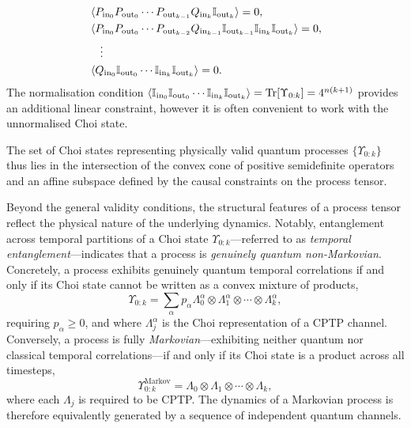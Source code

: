 \begin{enumerate}
    \begin{equation}
        \begin{split}
            &\braket{P_{\mathrm{in}_0}P_{\mathrm{out}_0}\cdots P_{\mathrm{out}_{k-1}}Q_{\mathrm{in}_k}\mathbb{I}_{\mathrm{out}_k}} = 0, \\
            &\braket{P_{\mathrm{in}_0}P_{\mathrm{out}_0}\cdots P_{\mathrm{out}_{k-2}}Q_{\mathrm{in}_{k-1}}\mathbb{I}_{\mathrm{out}_{k-1}}\mathbb{I}_{\mathrm{in}_k}\mathbb{I}_{\mathrm{out}_k}} = 0, \\
            &\quad\vdots \\
            &\braket{Q_{\mathrm{in}_0}\mathbb{I}_{\mathrm{out}_0}\cdots \mathbb{I}_{\mathrm{in}_k}\mathbb{I}_{\mathrm{out}_k}} = 0.
        \end{split}
    \end{equation}
    The normalisation condition \(\braket{\mathbb{I}_{\mathrm{in}_0}\mathbb{I}_{\mathrm{out}_0}\cdots \mathbb{I}_{\mathrm{in}_k}\mathbb{I}_{\mathrm{out}_k}} = \mathrm{Tr}{[\Upsilon_{0:k}]} = 4^{n(k+1)}\) provides an additional linear constraint, however it is often convenient to work with the unnormalised Choi state. \\
\end{enumerate}
The set of Choi states representing physically valid quantum processes \(\{\Upsilon_{0:k}\}\) thus lies in the intersection of the convex cone of positive semidefinite operators and an affine subspace defined by the causal constraints on the process tensor.

Beyond the general validity conditions, the structural features of a process tensor reflect the physical nature of the underlying dynamics. Notably, entanglement across temporal partitions of a Choi state \(\Upsilon_{0:k}\)---referred to as \emph{temporal entanglement}---indicates that a process is \emph{genuinely quantum non-Markovian}. Concretely, a process exhibits genuinely quantum temporal correlations if and only if its Choi state cannot be written as a convex mixture of products, 
\begin{equation}
\Upsilon_{0:k} = \sum_\alpha p_\alpha \Lambda_0^\alpha \otimes \Lambda_1^\alpha \otimes \cdots \otimes \Lambda_k^\alpha,
\end{equation}
requiring \(p_\alpha \geq 0\), and where \(\Lambda_j^\alpha\) is the Choi representation of a CPTP channel. Conversely, a process is fully \emph{Markovian}---exhibiting neither quantum nor classical temporal correlations---if and only if its Choi state is a product across all timesteps,
\begin{equation}
    \Upsilon_{0:k}^{\textrm{Markov}} = \Lambda_0 \otimes \Lambda_1 \otimes \cdots \otimes \Lambda_k,
\end{equation}
where each \(\Lambda_j\) is required to be CPTP. The dynamics of a Markovian process is therefore equivalently generated by a sequence of independent quantum channels.

